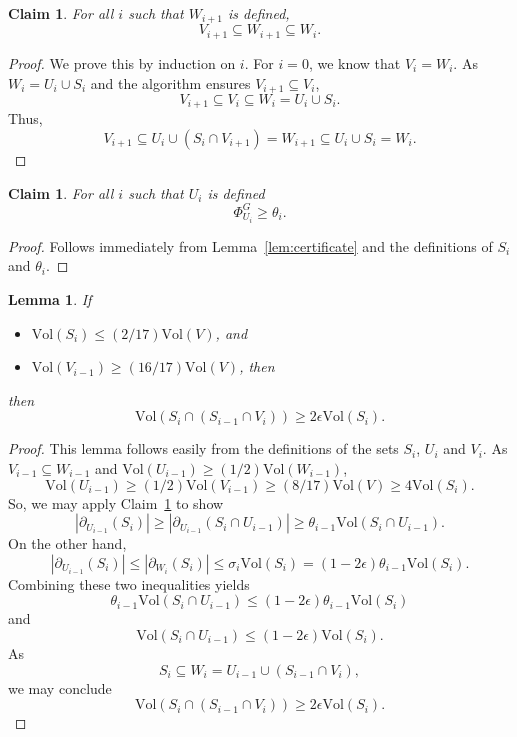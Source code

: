 \documentclass[11pt]{article}
\newtheorem{lemma}[theorem]{Lemma}
\newtheorem{claim}[theorem]{Claim}
\def\bdry#1#2{\partial_{#1}\left(#2\right)}
\def\union{\cup}
\def\intersect{\cap}
\def\sizeof#1{\left|#1  \right|}
\def\intersect{\cap}
\def\vol#1{\mathrm{Vol}\left(#1  \right)}
\def\Conducin#1{\Phi^{G}_{#1}}
\begin{document}
\begin{claim}\label{clm:VinsideW}
For all $i$ such that $W_{i+1}$ is defined,
\[
  V_{i+1} \subseteq W_{i+1} \subseteq W_{i}.
\]
\end{claim}
\begin{proof}
We prove this by induction on $i$.
For $i = 0$, we know that $V_{i} = W_{i}$.
As $W_{i} = U_{i} \union S_{i}$ and the algorithm ensures $V_{i+1} \subseteq V_{i}$,
\[
  V_{i+1} \subseteq V_{i} \subseteq W_{i} = U_{i} \union S_{i}.
\]
Thus,
\[
  V_{i+1} \subseteq U_{i} \union (S_{i} \intersect V_{i+1})
  = W_{i+1}
  \subseteq U_{i} \union S_{i}
  = W_{i}.
\]
\end{proof}


\begin{claim}\label{clm:uiExpander}
For all $i$ such that $U_{i}$ is defined
\[
\Conducin{U_{i}} \geq \theta_{i}.
\]
\end{claim}
\begin{proof}
Follows immediately from  Lemma~\ref{lem:certificate} and
  the definitions of $S_{i}$ and $\theta_{i}$.
\end{proof}


\begin{lemma}\label{lem:ac1}
If
\begin{itemize}
\item [(a)] $\vol{S_{i}} \leq (2/17) \vol{V}$, and
\item [(b)] $\vol{V_{i-1}} \geq (16/17) \vol{V}$, then
\end{itemize}
  then
\[
\vol{S_{i} \intersect (S_{i-1} \intersect V_{i})} \geq 2 \epsilon \vol{S_{i}}.
\]
\end{lemma}
\begin{proof}
This lemma follows easily from the definitions of the sets 
  $S_{i}$, $U_{i}$ and $V_{i}$.
As $V_{i-1} \subseteq W_{i-1}$ and $\vol{U_{i-1}} \geq (1/2) \vol{W_{i-1}}$,
\[
  \vol{U_{i-1}} \geq (1/2) \vol{V_{i-1}}
  \geq (8/17) \vol{V}
 \geq 4 \vol{S_{i}}.
\]
So, we may apply Claim~\ref{clm:uiExpander} 
  to show
\[
 \sizeof{ \bdry{U_{i-1}}{S_{i}}}
  \geq 
 \sizeof{ \bdry{U_{i-1}}{S_{i} \intersect U_{i-1}}}
   \geq \theta_{i-1} \vol{S_{i} \intersect U_{i-1}}.
\]
On the other hand, 
\[
 \sizeof{  \bdry{U_{i-1}}{S_{i}}}
\leq 
 \sizeof{  \bdry{W_{i}}{S_{i}}}
\leq 
  \sigma_{i} \vol{S_{i}}  
 =
  (1-2\epsilon) \theta_{i-1} \vol{S_{i}}.
\]
Combining these two inequalities yields
\[
\theta_{i-1} \vol{S_{i} \intersect U_{i-1}}
\leq 
  (1-2\epsilon) \theta_{i-1} \vol{S_{i}}
\]
and
\[
 \vol{S_{i} \intersect U_{i-1}}
\leq 
  (1-2\epsilon) \vol{S_{i}}.
\]
As
\[
  S_{i} \subseteq W_{i} = U_{i-1} \union (S_{i-1} \intersect V_{i}),
\]
we may conclude
\[
  \vol{S_{i} \intersect (S_{i-1} \intersect V_{i})} 
\geq
  2 \epsilon \vol{S_{i}}.
\]
\end{proof}
\end{document}

